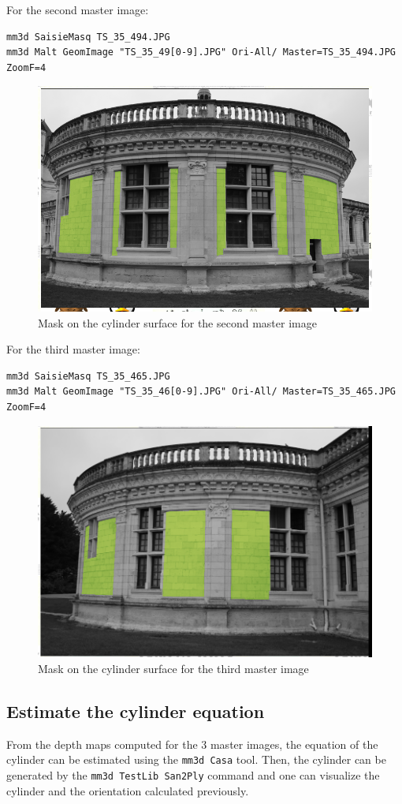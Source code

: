 For the second master image:
\begin{verbatim}
mm3d SaisieMasq TS_35_494.JPG
mm3d Malt GeomImage "TS_35_49[0-9].JPG" Ori-All/ Master=TS_35_494.JPG ZoomF=4
\end{verbatim}

\begin{figure}[H]
    \begin{center}
    \setlength{\unitlength}{0.5cm}
    \includegraphics[width=0.4\linewidth]{FIGS/ChambordTower/masq_m2_chambord_tower.png}
    \end{center}
    \caption{Mask on the cylinder surface for the second master image}
    \label{fig:maskImg2}
\end{figure}

For the third master image:
\begin{verbatim}
mm3d SaisieMasq TS_35_465.JPG
mm3d Malt GeomImage "TS_35_46[0-9].JPG" Ori-All/ Master=TS_35_465.JPG ZoomF=4
\end{verbatim}

\begin{figure}[H]
    \begin{center}
    \setlength{\unitlength}{0.5cm}
    \includegraphics[width=0.4\linewidth]{FIGS/ChambordTower/masq_m3_chambord_tower.png}
    \end{center}
    \caption{Mask on the cylinder surface for the third master image}
    \label{fig:maskImg3}
\end{figure}

\subsection{Estimate the cylinder equation}
From the depth maps computed for the 3 master images, the equation of the cylinder can be estimated using the {\tt mm3d Casa} tool. Then, the cylinder can be generated by the {\tt mm3d TestLib San2Ply} command and one can visualize the cylinder and the orientation calculated previously.

